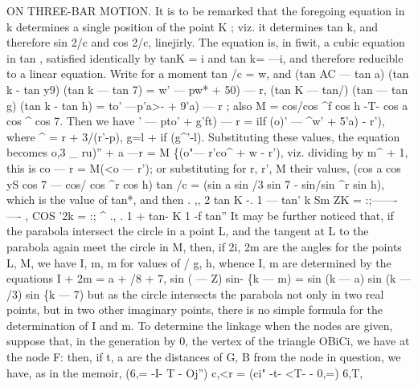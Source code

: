 \documentclass[11pt,a4paper]{book}
\begin{document}
ON THREE-BAR MOTION.
It
is
to be remarked
that
the foregoing equation
in
k
determines a single
position
of
the
point K ;
viz.
it
determines
tan k,
and
therefore
sin
2/c
and
cos 2/c,
linejirly.
The
equation
is,
in
fiwit,
a
cubic
equation
in
tan \guillemotleft{},
satisfied
identically
by tanK = i
and tan k= ---i, and
therefore reducible to a
linear equation.
Write
for a moment
tan
/c = w, and
(tan AC --- tan a) (tan k - tan y9) (tan k --- tan 7) = w' --- pw* + 50) --- r,
(tan K --- tan/) (tan \guillemotleft{} --- tan g) (tan k - tan h) = to' ---p'a>- + 9'a) --- r
;
also
M = cos/cos \textasciicircum{}f cos h -T- cos a cos \textasciicircum{} cos 7.
Then we have
\guillemotleft{}' --- pto' + g'ft) --- r = ilf (o)' --- \textasciicircum{}w' + 5'a) - r'),
where
\textasciicircum{} = r + 3/(r'-p), g=l + if (g\textasciicircum{}'-l).
Substituting these
values, the equation becomes
o,3 \_ ru)'' + a ---r = M \{(o"--- r'co\textasciicircum{} + w - r'),
viz.
dividing by
m\textasciicircum{} + 1,
this
is
co --- r = M(<o --- r');
or
substituting
for
r,
r', M
their
values,
(cos a cos yS cos 7 --- cos/ cos \textasciicircum{}r cos h) tan /c = (sin a sin /3 sin 7 - sin/sin \textasciicircum{}r sin h),
which
is the value
of tan*, and
then
.
,,
2 tan K
-.
1 --- tan' k
Sm ZK = :;-------
----
,
COS '2k =
:;
\textasciicircum{}
.,
.
1 + tan- K
1 -f tan''
It may be
further
noticed
that,
if
the
parabola
intersect the
circle
in
a
point L,
and
the
tangent
at L
to
the
parabola
again
meet
the
circle
in M,
then,
if
2i, 2m
are
the
angles
for
the
points
L,
M,
we
have
I,
m, m
for
values
of /
g,
h,
whence
I, m are determined by the
equations
I + 2m = a + /8 + 7, sin (\guillemotleft{} --- Z) sin- \{k --- m) = sin (k --- a) sin (k --- /3) sin \{k --- 7)
but
as
the
circle
intersects
the
parabola
not
only
in
two
real
points,
but
in
two
other imaginary
points, there
is no simple formula
for the determination of
I and m.
To determine the linkage when the nodes are given, suppose
that,
in
the generation
by
0,
the
vertex
of
the
triangle
OBiCi,
we
have
at
the
node
F:
then,
if
t, a
are the distances
of
G, B from
the node
in
question, we
have,
as
in the memoir,
(6,=
-I- T\guillemotright{} - Oj'') c,<r = (ci" -t- <T- - 0,=) 6,T,
\end{document}
